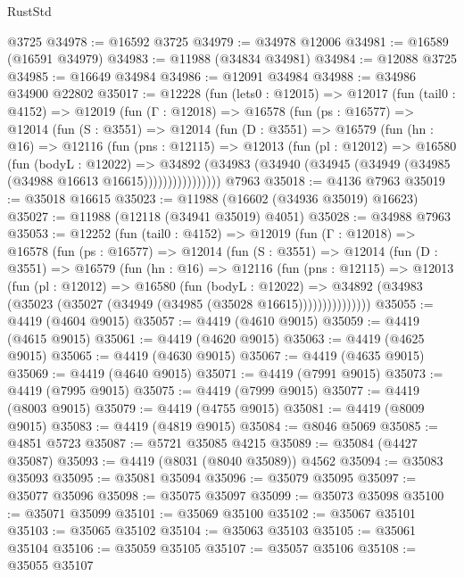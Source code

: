 \begin{lexlean}{RustStd}
\begin{coremodule}
    @3725
@34978 := @16592 @3725
@34979 := @34978 @12006
@34981 := @16589 (@16591 @34979)
@34983 := @11988 (@34834 @34981)
@34984 := @12088 @3725
@34985 := @16649 @34984
@34986 := @12091 @34984
@34988 := @34986 @34900 @22802
@35017 := @12228
    (fun (lets0 : @12015) =>
    @12017
      (fun (tail0 : @4152) =>
      @12019
        (fun (Γ : @12018) =>
        @16578
          (fun (ps : @16577) =>
          @12014
            (fun (S : @3551) =>
            @12014
              (fun (D : @3551) =>
              @16579
                (fun (hn : @16) =>
                @12116
                  (fun (pns : @12115) =>
                  @12013
                    (fun (pl : @12012) =>
                    @16580
                      (fun (bodyL : @12022) =>
                      @34892
                        (@34983
                          (@34940 (@34945 (@34949 (@34985 (@34988 @16613 @16615))))))))))))))))
    @7963
@35018 := @4136 @7963
@35019 := @35018 @16615
@35023 := @11988 (@16602 (@34936 @35019) @16623)
@35027 := @11988 (@12118 (@34941 @35019) @4051)
@35028 := @34988 @7963
@35053 := @12252
    (fun (tail0 : @4152) =>
    @12019
      (fun (Γ : @12018) =>
      @16578
        (fun (ps : @16577) =>
        @12014
          (fun (S : @3551) =>
          @12014
            (fun (D : @3551) =>
            @16579
              (fun (hn : @16) =>
              @12116
                (fun (pns : @12115) =>
                @12013
                  (fun (pl : @12012) =>
                  @16580
                    (fun (bodyL : @12022) =>
                    @34892 (@34983 (@35023 (@35027 (@34949 (@34985 (@35028 @16615)))))))))))))))
@35055 := @4419 (@4604 @9015)
@35057 := @4419 (@4610 @9015)
@35059 := @4419 (@4615 @9015)
@35061 := @4419 (@4620 @9015)
@35063 := @4419 (@4625 @9015)
@35065 := @4419 (@4630 @9015)
@35067 := @4419 (@4635 @9015)
@35069 := @4419 (@4640 @9015)
@35071 := @4419 (@7991 @9015)
@35073 := @4419 (@7995 @9015)
@35075 := @4419 (@7999 @9015)
@35077 := @4419 (@8003 @9015)
@35079 := @4419 (@4755 @9015)
@35081 := @4419 (@8009 @9015)
@35083 := @4419 (@4819 @9015)
@35084 := @8046 @5069
@35085 := @4851 @5723
@35087 := @5721 @35085 @4215
@35089 := @35084 (@4427 @35087)
@35093 := @4419 (@8031 (@8040 @35089)) @4562
@35094 := @35083 @35093
@35095 := @35081 @35094
@35096 := @35079 @35095
@35097 := @35077 @35096
@35098 := @35075 @35097
@35099 := @35073 @35098
@35100 := @35071 @35099
@35101 := @35069 @35100
@35102 := @35067 @35101
@35103 := @35065 @35102
@35104 := @35063 @35103
@35105 := @35061 @35104
@35106 := @35059 @35105
@35107 := @35057 @35106
@35108 := @35055 @35107

\end{coremodule}
\end{lexlean}
